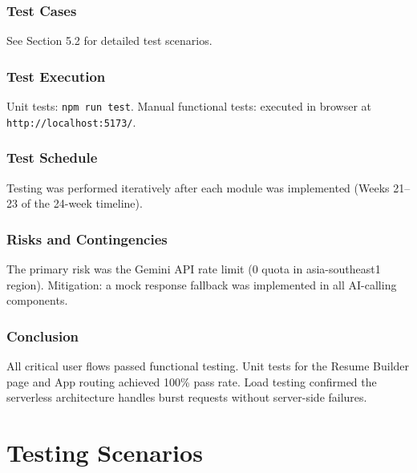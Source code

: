 \subsubsection*{Test Cases}
See Section 5.2 for detailed test scenarios.

\subsubsection*{Test Execution}
Unit tests: \texttt{npm run test}. Manual functional tests: executed in browser at \texttt{http://localhost:5173/}.

\subsubsection*{Test Schedule}
Testing was performed iteratively after each module was implemented (Weeks 21--23 of the 24-week timeline).

\subsubsection*{Risks and Contingencies}
The primary risk was the Gemini API rate limit (0 quota in asia-southeast1 region). Mitigation: a mock response fallback was implemented in all AI-calling components.

\subsubsection*{Conclusion}
All critical user flows passed functional testing. Unit tests for the Resume Builder page and App routing achieved 100\% pass rate. Load testing confirmed the serverless architecture handles burst requests without server-side failures.

\section{Testing Scenarios}

